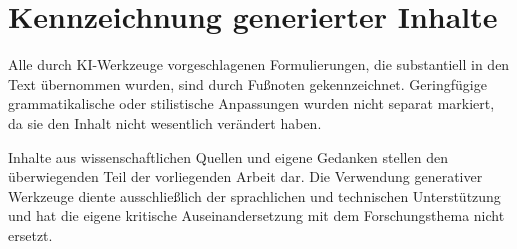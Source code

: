 \section*{Kennzeichnung generierter Inhalte}

Alle durch KI-Werkzeuge vorgeschlagenen Formulierungen, die substantiell in den Text übernommen wurden, sind durch Fußnoten gekennzeichnet. Geringfügige grammatikalische oder stilistische Anpassungen wurden nicht separat markiert, da sie den Inhalt nicht wesentlich verändert haben.

Inhalte aus wissenschaftlichen Quellen und eigene Gedanken stellen den überwiegenden Teil der vorliegenden Arbeit dar. Die Verwendung generativer Werkzeuge diente ausschließlich der sprachlichen und technischen Unterstützung und hat die eigene kritische Auseinandersetzung mit dem Forschungsthema nicht ersetzt.
